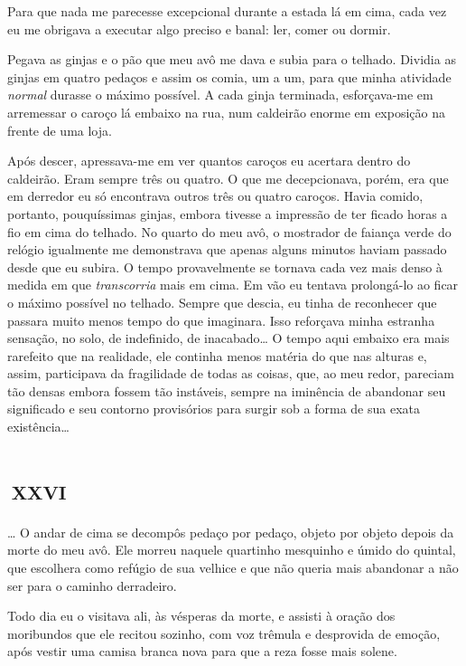 Para que nada me parecesse excepcional durante a estada lá em cima, cada vez eu me obrigava a executar algo preciso e banal: ler, comer ou dormir.

Pegava as ginjas e o pão que meu avô me dava e subia para o telhado. Dividia as ginjas em quatro pedaços e assim os comia, um a um, para que minha atividade \textit{normal} durasse o máximo possível. A cada ginja terminada, esforçava-me em arremessar o caroço lá embaixo na rua, num caldeirão enorme em exposição na frente de uma loja.

Após descer, apressava-me em ver quantos caroços eu acertara dentro do caldeirão. Eram sempre três ou quatro. O que me decepcionava, porém, era que em derredor eu só encontrava outros três ou quatro caroços. Havia comido, portanto, pouquíssimas ginjas, embora tivesse a impressão de ter ficado horas a fio em cima do telhado. No quarto do meu avô, o mostrador de faiança verde do relógio igualmente me demonstrava que apenas alguns minutos haviam passado desde que eu subira. O tempo provavelmente se tornava cada vez mais denso à medida em que \textit{transcorria} mais em cima. Em vão eu tentava prolongá-lo ao ficar o máximo possível no telhado. Sempre que descia, eu tinha de reconhecer que passara muito menos tempo do que imaginara. Isso reforçava minha estranha sensação, no solo, de indefinido, de inacabado\ldots{} O tempo aqui embaixo era mais rarefeito que na realidade, ele continha menos matéria do que nas alturas e, assim, participava da fragilidade de todas as coisas, que, ao meu redor, pareciam tão densas embora fossem tão instáveis, sempre na iminência de abandonar seu significado e seu contorno provisórios para surgir sob a forma de sua exata existência\ldots{}


\chapter*{\small{}\,\Large\centering\textsc{xxvi}\,\small{}}

\ldots{} O andar de cima se decompôs pedaço por pedaço, objeto por objeto depois da morte do meu avô. Ele morreu naquele quartinho mesquinho e úmido do quintal, que escolhera como refúgio de sua velhice e que não queria mais abandonar a não ser para o caminho derradeiro.

Todo dia eu o visitava ali, às vésperas da morte, e assisti à oração dos moribundos que ele recitou sozinho, com voz trêmula e desprovida de emoção, após vestir uma camisa branca nova para que a reza fosse mais solene.

